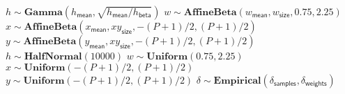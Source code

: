 \begin{algorithmic}[1]
                \State $h \sim \mathbf{Gamma}(h_\mathsf{mean}, \sqrt{h_\mathsf{mean} / h_\mathsf{beta}})$
                \State $w \sim \mathbf{AffineBeta}(w_\mathsf{mean}, w_\mathsf{size}, 0.75, 2.25)$
                \State $x \sim \mathbf{AffineBeta} \left( x_\mathsf{mean}, xy_\mathsf{size}, -(P+1)/2, (P+1)/2 \right) $
                \State $y \sim \mathbf{AffineBeta} \left( y_\mathsf{mean}, xy_\mathsf{size}, -(P+1)/2, (P+1)/2 \right)$
                \State $h \sim \mathbf{HalfNormal}(10000)$
                \State $w \sim \mathbf{Uniform}(0.75, 2.25)$
                \State $x \sim \mathbf{Uniform}(-(P+1)/2, (P+1)/2)$
                \State $y \sim \mathbf{Uniform}(-(P+1)/2, (P+1)/2)$
            \EndIf
        \EndFor
            \State $\delta \sim \mathbf{Empirical}( \delta_\mathsf{samples}, \delta_\mathsf{weights})$
        \EndFor
    \EndFor
\EndFor
\end{algorithmic}